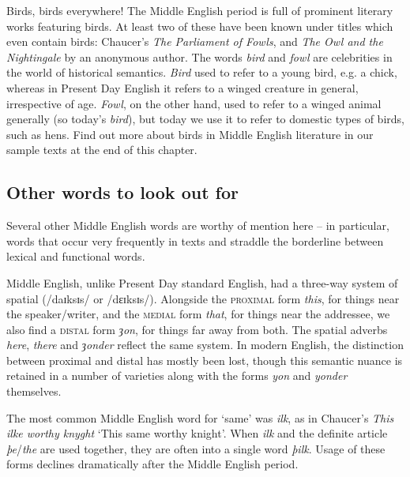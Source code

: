 \begin{sourcebox}{Birds, birds everywhere!}
\label{BIRDS}
The Middle English period is full of prominent literary works featuring birds. At least two of these have been known under titles which even contain birds: Chaucer's \textit{The Parliament of Fowls}, and \textit{The Owl and the Nightingale} by an anonymous author. The words \textit{bird} and \textit{fowl} are celebrities in the world of historical semantics. \textit{Bird} used to refer to a young bird, e.g. a chick, whereas in Present Day English it refers to a winged creature in general, irrespective of age. \textit{Fowl}, on the other hand, used to refer to a winged animal generally (so today's \textit{bird}), but today we use it to refer to domestic types of birds, such as hens. Find out more about birds in Middle English literature in our sample texts at the end of this chapter.
\end{sourcebox}


\subsection{Other words to look out for}

Several other Middle English words are worthy of mention here -- in particular, words that occur very frequently in texts and straddle the borderline between lexical and functional words.

Middle English, unlike Present Day standard English, had a three-way system of spatial  (/daɪksɪs/ or /dɛɪksɪs/). Alongside the \textsc{proximal} form \emph{this}, for things near the speaker/writer, and the \textsc{medial} form \emph{that}, for things near the addressee, we also find a \textsc{distal} form \emph{ȝon}, for things far away from both. The spatial adverbs \emph{here}, \emph{there} and \emph{ȝonder} reflect the same system. In modern English, the distinction between proximal and distal has mostly been lost, though this semantic nuance is retained in a number of varieties along with the forms \emph{yon} and \emph{yonder} themselves.

The most common Middle English word for `same' was \emph{ilk}, as in Chaucer's \emph{This ilke worthy knyght} `This same worthy knight'. When \emph{ilk} and the definite article \emph{þe}/\emph{the} are used together, they are often  into a single word \emph{þilk}. Usage of these forms declines dramatically after the Middle English period.

